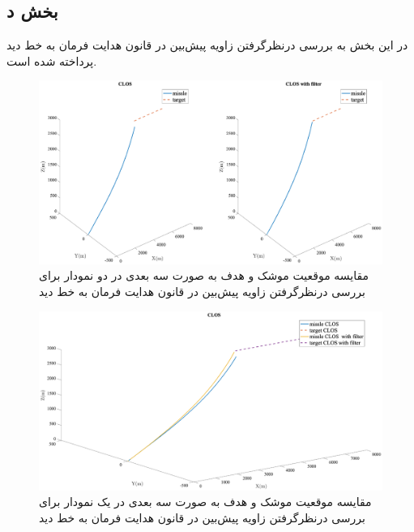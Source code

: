 \subsection{بخش د}
در این بخش به بررسی درنظرگرفتن زاویه پیش‌بین در قانون هدایت فرمان به خط دید پرداخته شده است.
\begin{figure}[H]
	\centering
	\includegraphics[width=\linewidth]{../Figure/i/3DoF_missle_vs_target_state_CLOS}
	\caption{مقایسه موقعیت موشک و هدف به صورت سه بعدی در دو نمودار  برای بررسی درنظرگرفتن زاویه پیش‌بین در قانون هدایت فرمان به خط دید}
\end{figure}


\begin{figure}[H]
	\centering
	\includegraphics[width=\linewidth]{../Figure/i/3DoF_missle_vs_target_state_CLOS_all_in}
	\caption{مقایسه موقعیت موشک و هدف به صورت سه بعدی در یک نمودار برای بررسی درنظرگرفتن زاویه پیش‌بین در قانون هدایت فرمان به خط دید}
\end{figure}


